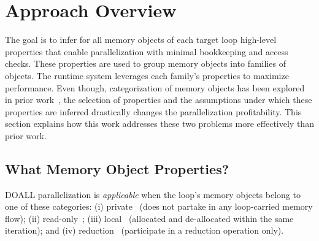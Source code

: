 \section{Approach Overview}
\label{sec:overview}

The goal is to infer for all memory objects of each target loop high-level
properties that enable parallelization with minimal bookkeeping and access
checks.
%
These properties are used to group memory objects into families of objects.
The runtime system leverages each family's properties to maximize performance.
%
Even though, categorization of memory objects has been explored in prior
work~\cite{johnson:12:pldi, kim:12:cgo, corD},
%
the selection of properties and the assumptions under which these properties are
inferred drastically changes the parallelization profitability.  This section
explains how this work addresses these two problems more effectively than prior
work.


\subsection{What Memory Object Properties?}

DOALL parallelization is \textit{applicable} when the loop's memory objects
belong to one of these categories: (i) private~\cite{privateer,LRPD} (does not
partake in any loop-carried memory flow); (ii) read-only~\cite{tian:10:pldi,
johnson:12:pldi}; (iii) local~\cite{tian:10:pldi, johnson:12:pldi,clusterDoall}
(allocated and de-allocated within the same iteration); and (iv)
reduction~\cite{privateer,LRPD_the_one_withreductionPriv} (participate in a
reduction operation only).
%

